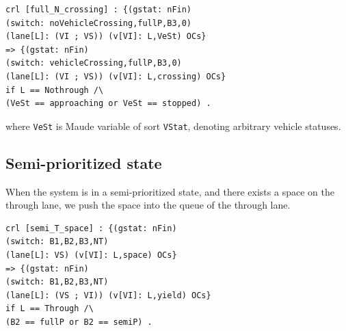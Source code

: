 \documentclass[10pt, conference, compsocconf]{IEEEtran}
\begin{document}
\begin{small}
\begin{verbatim}
crl [full_N_crossing] : {(gstat: nFin) 
(switch: noVehicleCrossing,fullP,B3,0) 
(lane[L]: (VI ; VS)) (v[VI]: L,VeSt) OCs} 
=> {(gstat: nFin) 
(switch: vehicleCrossing,fullP,B3,0) 
(lane[L]: (VI ; VS)) (v[VI]: L,crossing) OCs}
if L == Nothrough /\ 
(VeSt == approaching or VeSt == stopped) .
\end{verbatim}
\end{small}

\noindent
where \verb!VeSt! is Maude variable of sort \verb!VStat!, denoting arbitrary vehicle statuses.

\subsection{Semi-prioritized state}

%

When the system is in a semi-prioritized state, and there exists a space on the through lane, we push the space into the queue of the through lane.

\begin{small}
\begin{verbatim}
crl [semi_T_space] : {(gstat: nFin) 
(switch: B1,B2,B3,NT) 
(lane[L]: VS) (v[VI]: L,space) OCs}
=> {(gstat: nFin)
(switch: B1,B2,B3,NT) 
(lane[L]: (VS ; VI)) (v[VI]: L,yield) OCs}
if L == Through /\ 
(B2 == fullP or B2 == semiP) .
\end{verbatim}
\end{small}
\end{document}
